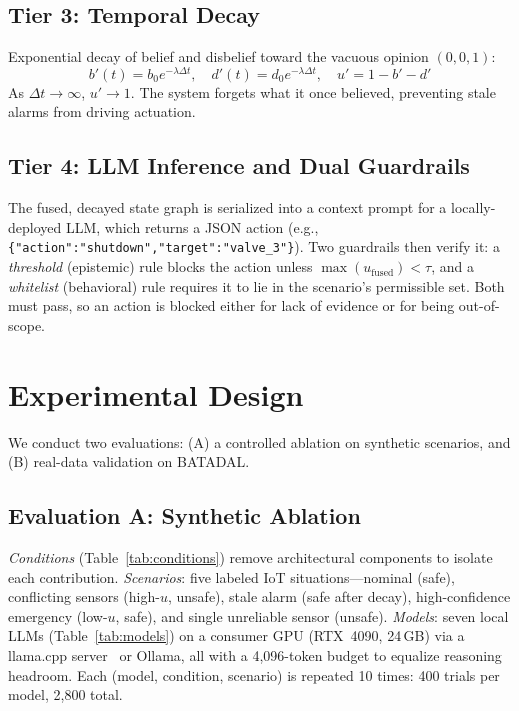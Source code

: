 \documentclass[conference]{IEEEtran}
\begin{document}
\subsection{Tier 3: Temporal Decay}
Exponential decay of belief and disbelief toward the vacuous opinion $(0,0,1)$:
\begin{equation}
b'(t) = b_0 e^{-\lambda \Delta t},\quad d'(t) = d_0 e^{-\lambda \Delta t},\quad u' = 1 - b' - d'
\label{eq:decay}
\end{equation}
As $\Delta t \to \infty$, $u' \to 1$. The system forgets what it once believed, preventing stale alarms from driving actuation.

\subsection{Tier 4: LLM Inference and Dual Guardrails}
The fused, decayed state graph is serialized into a context prompt for a locally-deployed LLM, which returns a JSON action (e.g., \texttt{\{"action":"shutdown","target":"valve\_3"\}}). Two guardrails then verify it: a \textit{threshold} (epistemic) rule blocks the action unless $\max(u_{\text{fused}}) < \tau$, and a \textit{whitelist} (behavioral) rule requires it to lie in the scenario's permissible set. Both must pass, so an action is blocked either for lack of evidence or for being out-of-scope.

\section{Experimental Design}
\label{sec:experiments}

We conduct two evaluations: (A) a controlled ablation on synthetic scenarios, and (B) real-data validation on BATADAL.

\subsection{Evaluation A: Synthetic Ablation}

\textit{Conditions} (Table~\ref{tab:conditions}) remove architectural components to isolate each contribution. \textit{Scenarios}: five labeled IoT situations---nominal (safe), conflicting sensors (high-$u$, unsafe), stale alarm (safe after decay), high-confidence emergency (low-$u$, safe), and single unreliable sensor (unsafe). \textit{Models}: seven local LLMs (Table~\ref{tab:models}) on a consumer GPU (RTX~4090, 24\,GB) via a llama.cpp server~\cite{gerganov2023llamacpp} or Ollama, all with a 4{,}096-token budget to equalize reasoning headroom. Each (model, condition, scenario) is repeated 10 times: 400 trials per model, 2{,}800 total.
\end{document}

